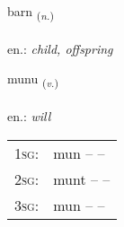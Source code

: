 \documentclass[frontgrid, backgrid]{flacards}\usepackage[]{graphicx}\usepackage[]{xcolor}
\begin{document}
\renewcommand{\blhead}{\vskip5pt {\small\bfseries\footnotesize Nafnorð | Noun }}
\renewcommand{\bcfoot}{\vskip5pt \hspace{2pt}{\small\bfseries\footnotesize 1K}}


{barn \small{\textsubscript{(\textit{n.})}} \\[1ex] %
\textphonetic{[partn̥]} \\
en.: \emph{child, offspring} \\  [2ex]
\renewcommand*{\arraystretch}{0.8}
}

\renewcommand{\flhead}{\vskip5pt \fboxsep=0pt {\small\bfseries\footnotesize Sagnorð | Verb}}
\renewcommand{\fcfoot}{\vskip5pt \fboxsep=0pt \hspace{2pt}{\small\bfseries\footnotesize 1K}}

\renewcommand{\blhead}{\vskip5pt {\small\bfseries\footnotesize Sagnorð | Verb }}
\renewcommand{\bcfoot}{\vskip5pt \hspace{2pt}{\small\bfseries\footnotesize 1K}}


{munu \small{\textsubscript{(\textit{v.})}} \\[1ex] %
\textphonetic{[mʏːnʏ]} \\
en.: \emph{will} \\  [2ex]
\renewcommand*{\arraystretch}{0.8}
\begin{tabular}{p{1cm}l}
\textsc{1sg}: & mun --  --  \\ 
\textsc{2sg}: & munt --  --  \\ 
\textsc{3sg}: & mun --  --  \\ 
\end{tabular}
}

\end{document}
